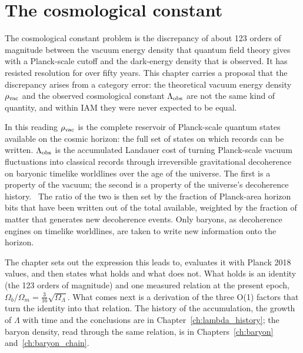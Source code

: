 \chapter{The cosmological constant}\label{ch:lambda}

The cosmological constant problem is the discrepancy of about 123 orders of magnitude between the vacuum energy density that quantum
field theory gives with a Planck-scale cutoff and the dark-energy density that is observed. It has resisted resolution for over fifty
years. This chapter carries a proposal that the discrepancy arises from a category error: the theoretical vacuum energy density
$\rho_{\rm vac}$ and the observed cosmological constant $\Lambda_{\rm obs}$ are not the same kind of quantity, and within IAM they were
never expected to be equal. \interp

In this reading $\rho_{\rm vac}$ is the complete reservoir of Planck-scale quantum states available on the cosmic horizon: the full set
of states on which records can be written. $\Lambda_{\rm obs}$ is the accumulated Landauer cost of turning Planck-scale vacuum
fluctuations into classical records through irreversible gravitational decoherence on baryonic timelike worldlines over the age of
the universe. The first is a property of the vacuum; the second is a property of the universe's decoherence history. \interp\ The
ratio of the two is then set by the fraction of Planck-area horizon bits that have been written out of the total available, weighted
by the fraction of matter that generates new decoherence events. Only baryons, as decoherence engines on timelike worldlines, are
taken to write new information onto the horizon. \conjecture

The chapter sets out the expression this leads to, evaluates it with Planck 2018 values, and then states what holds and what does not.
What holds is an identity (the 123 orders of magnitude) and one measured relation at the present epoch,
$\Omega_b/\Omega_m=\tfrac3{16}\sqrt{\Omega_\Lambda}$. What comes next is a derivation of the three O(1) factors that turn the
identity into that relation. The history of the accumulation, the growth of $\Lambda$ with time and the conclusions are in
Chapter~\ref{ch:lambda_history}; the baryon density, read through the same relation, is in Chapters~\ref{ch:baryon}
and~\ref{ch:baryon_chain}.


